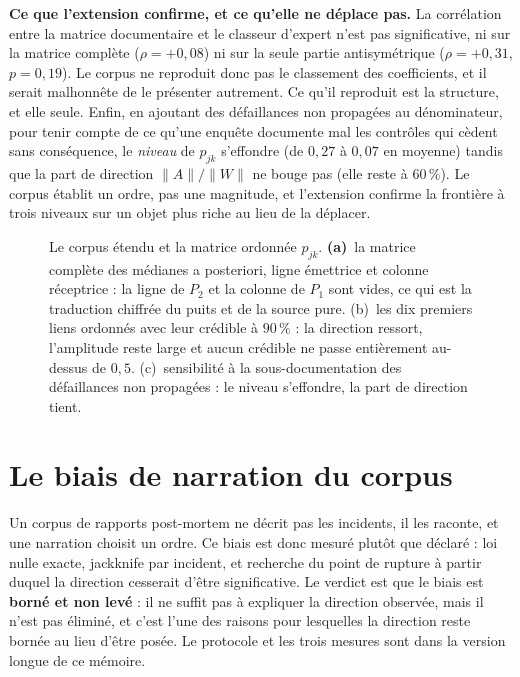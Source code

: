 \begin{cle}
\textbf{Ce que l'extension confirme, et ce qu'elle ne déplace pas.} La corrélation entre la
matrice documentaire et le classeur d'expert n'est pas significative, ni sur la matrice
complète ($\rho=+0{,}08$) ni sur la seule partie antisymétrique ($\rho=+0{,}31$, $p=0{,}19$).
Le corpus ne reproduit donc pas le classement des coefficients, et il serait malhonnête de le
présenter autrement. Ce qu'il reproduit est la structure, et elle seule. Enfin, en
ajoutant des défaillances non propagées au dénominateur, pour tenir compte de ce qu'une enquête
documente mal les contrôles qui cèdent sans conséquence, le \emph{niveau} de $p_{jk}$ s'effondre
(de $0{,}27$ à $0{,}07$ en moyenne) tandis que la part de direction
$\lVert A\rVert/\lVert W\rVert$ ne bouge pas (elle reste à $60\,\%$). Le corpus établit un
ordre, pas une magnitude, et l'extension confirme la frontière à trois niveaux sur un
objet plus riche au lieu de la déplacer.
\end{cle}

\begin{figure}[htbp]
  \centering
  \caption{Le corpus étendu et la matrice ordonnée $p_{jk}$.
\textbf{(a)}~la matrice complète des médianes a posteriori, ligne émettrice et colonne
réceptrice : la ligne de $P_2$ et la colonne de $P_1$ sont vides, ce qui est la traduction
chiffrée du puits et de la source pure. (b)~les dix premiers liens ordonnés avec leur
crédible à $90\,\%$ : la direction ressort, l'amplitude reste large et aucun crédible ne passe
entièrement au-dessus de $0{,}5$. (c)~sensibilité à la sous-documentation des
défaillances non propagées : le niveau s'effondre, la part de direction tient.}
  \label{fig:corpus-etendu}
\end{figure}

\section{Le biais de narration du corpus}
\label{sec:biais-narration}
Un corpus de rapports post-mortem ne décrit pas les incidents, il les raconte, et une
narration choisit un ordre. Ce biais est donc mesuré plutôt que déclaré : loi nulle
exacte, jackknife par incident, et recherche du point de rupture à partir duquel la
direction cesserait d'être significative. Le verdict est que le biais est \textbf{borné et
non levé} : il ne suffit pas à expliquer la direction observée, mais il n'est pas
éliminé, et c'est l'une des raisons pour lesquelles la direction reste bornée au lieu
d'être posée. Le protocole et les trois mesures sont dans la version longue de ce mémoire.

